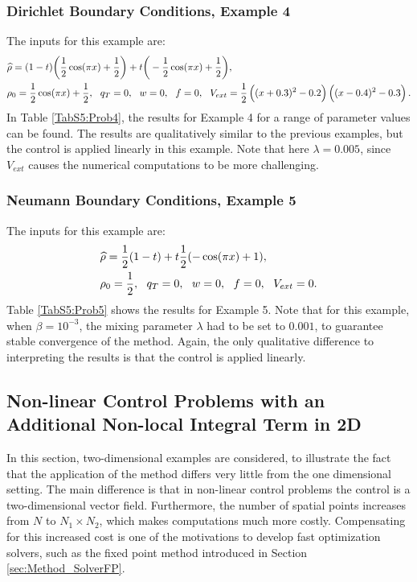 \subsubsection{Dirichlet Boundary Conditions, Example 4}
The inputs for this example are:
\begin{align*}
&\widehat \rho = (1 - t)\bigg(\frac{1}{2}\cos(\pi x) + \frac{1}{2}\bigg)  + t\bigg(-\frac{1}{2}\cos(\pi x) + \frac{1}{2}\bigg),\\
&\rho_{0} = \frac{1}{2}\cos(\pi x) + \frac{1}{2},\ \
q_{T} = 0,\ \
{w} = 0,\ \
f =0, \ \
V_{ext} =\frac{1}{2}\left((x + 0.3)^2 - 0.2\right)\left((x-0.4)^2 - 0.3\right).
\end{align*}
In Table \ref{TabS5:Prob4}, the results for Example 4 for a range of parameter values can be found. The results are qualitatively similar to the previous examples, but the control is applied linearly in this example. Note that here $\lambda = 0.005$, since $V_{{ext}}$ causes the numerical computations to be more challenging.




\subsubsection{Neumann Boundary Conditions, Example 5}
The inputs for this example are:
\begin{align*}
&\widehat \rho = \frac{1}{2}(1-t) + t\frac{1}{2}(-\cos(\pi x) + 1),\\
&\rho_{0} = \frac{1}{2},\ \
q_{T} = 0,\ \
{w} = 0,\ \
f =0,\ \
V_{ext} =0.
\end{align*}
Table \ref{TabS5:Prob5} shows the results for Example 5. Note that for this example, when $\beta = 10^{-3}$, the mixing parameter $\lambda$ had to be set to $0.001$, to guarantee stable convergence of the method.
Again, the only qualitative difference to interpreting the results is that the control is applied linearly.


\subsection{Non-linear Control Problems with an Additional Non-local Integral Term in 2D}
In this section, two-dimensional examples are considered, to illustrate the fact that the application of the method differs very little from the one dimensional setting. The main difference is that in non-linear control problems the control is a two-dimensional vector field. Furthermore, the number of spatial points increases from $N$ to $N_1\times N_2$, which makes computations much more costly. Compensating for this increased cost is one of the motivations to develop fast optimization solvers, such as the fixed point method introduced in Section \ref{sec:Method_SolverFP}.
